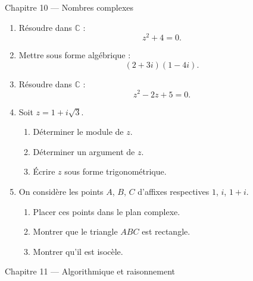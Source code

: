 \documentclass[11pt,a4paper]{article}
\newcommand{\C}{\mathbb{C}}
\begin{document}
\begin{chapitrebox}{Chapitre 10 --- Nombres complexes}
\end{chapitrebox}

\begin{enumerate}[label=\textbf{Exercice \arabic*.}, leftmargin=*, itemsep=1em]

\item Résoudre dans \(\C\) :
\[
z^2+4=0.
\]

\item Mettre sous forme algébrique :
\[
(2+3i)(1-4i).
\]

\item Résoudre dans \(\C\) :
\[
z^2-2z+5=0.
\]

\item Soit \(z=1+i\sqrt{3}\).

\begin{enumerate}[label=\alph*)]
    \item Déterminer le module de \(z\).
    \item Déterminer un argument de \(z\).
    \item Écrire \(z\) sous forme trigonométrique.
\end{enumerate}

\item On considère les points \(A\), \(B\), \(C\) d'affixes respectives \(1\), \(i\), \(1+i\).

\begin{enumerate}[label=\alph*)]
    \item Placer ces points dans le plan complexe.
    \item Montrer que le triangle \(ABC\) est rectangle.
    \item Montrer qu'il est isocèle.
\end{enumerate}

\end{enumerate}

\begin{chapitrebox}{Chapitre 11 --- Algorithmique et raisonnement}
\end{chapitrebox}
\end{document}
